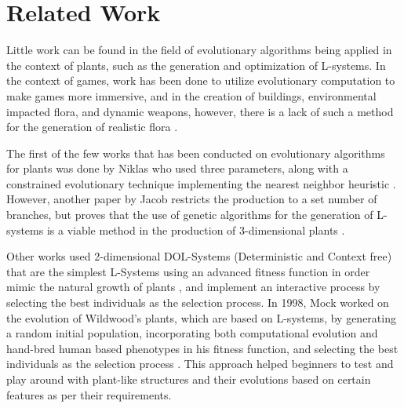 \section{Related Work}
Little work can be found in the field of evolutionary algorithms being applied in the context of plants, such as the generation and optimization of L-systems. In the context of games, work has been done to utilize evolutionary computation to make games more immersive, and in the creation of buildings, environmental impacted flora, and dynamic weapons\cite{wonka}\cite{shaker}\cite{visualmodels}, however, there is a lack of such a method for the generation of realistic flora \cite{evolving}. 

The first of the few works that has been conducted on evolutionary algorithms for plants was done by Niklas who used three parameters, along with a constrained evolutionary technique implementing the nearest neighbor heuristic \cite{d9683286-f374-3c0d-ae3c-3924235e199a}. However, another paper by Jacob restricts the production to a set number of branches, but proves that the use of genetic algorithms for the generation of L-systems is a viable method in the production of 3-dimensional plants \cite{evolprograms}. 

Other works used 2-dimensional DOL-Systems (Deterministic and Context free) that are the simplest L-Systems using an advanced fitness function in order mimic the natural growth of plants \cite{ochoa1998genetic}, and implement an interactive process by selecting the best individuals as the selection process. In 1998, Mock worked on the evolution of Wildwood's plants, which are based on L-systems, by generating a random initial population, incorporating both computational evolution and hand-bred human based phenotypes in his fitness function, and selecting the best individuals as the selection process \cite{wildwood}. This approach helped beginners to test and play around with plant-like structures and their evolutions based on certain features as per their requirements.  

